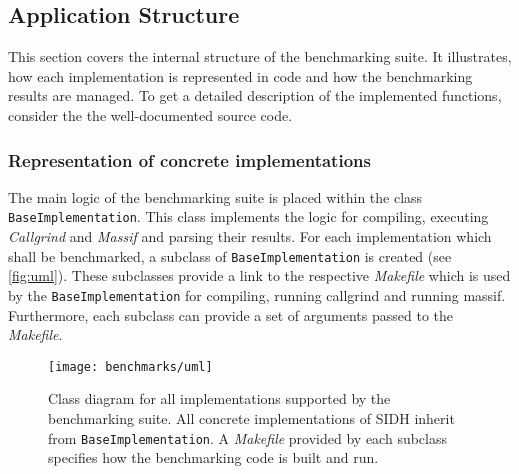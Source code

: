 \subsection{Application Structure}\label{sec:app_structure}

This section covers the internal structure of the benchmarking suite. It illustrates, how each implementation is represented in code and how the benchmarking results are managed. To get a detailed description of the implemented functions, consider the the well-documented source code.

\subsubsection{Representation of concrete implementations}

The main logic of the benchmarking suite is placed within the class \texttt{BaseImplementation}. This class implements the logic for compiling, executing \textit{Callgrind} and \textit{Massif} and parsing their results. For each implementation which shall be benchmarked, a subclass of \texttt{BaseImplementation} is created (see \autoref{fig:uml}). These subclasses provide a link to the respective \textit{Makefile} which is used by the \texttt{BaseImplementation} for compiling, running callgrind and running massif. Furthermore, each subclass can provide a set of arguments passed to the \textit{Makefile}.\\

\begin{figure}[H]
  \centering
  \texttt{[image: benchmarks/uml]}
  \caption[Class diagram for supported implementations]
  {Class diagram for all implementations supported by the benchmarking suite. All concrete implementations of \gls{SIDH} inherit from \texttt{BaseImplementation}. A \textit{Makefile} provided by each subclass specifies how the benchmarking code is built and run.} \label{fig:uml}
\end{figure}

